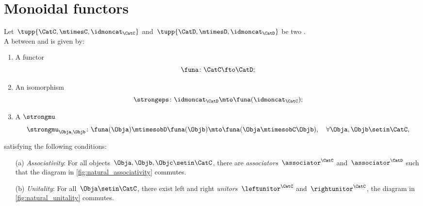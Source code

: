 
\section{Monoidal functors}
\label{sec:monoidal-functors}
\begin{ctdefinition}
    \label{def:strong-monoidal-functor}
    Let~$\tupp{\CatC,{{\mtimesC}},\idmoncat_{\CatC}}$ and~$\tupp{\CatD,{{\mtimesD}},\idmoncat_{\CatD}}$ be two .
    \\
    A  between \CatC and \CatD is given by:
    \begin{enumerate}
        \item A functor
              \begin{equation}
                  \funa \colon \CatC \fto \CatD;
              \end{equation}
        \item An isomorphism
              \begin{equation}
                  \strongeps\colon \idmoncat_{\CatD}\mto \funa(\idmoncat_{\CatC});
              \end{equation}
        \item A  $\strongmu$
              \begin{equation}
                  \strongmu_{\Obja,\Objb}\colon \funa(\Obja)\mtimesobD \funa(\Objb) \mto \funa(\Obja \mtimesobC \Objb),\quad \forall \Obja,\Objb\setin \CatC,
              \end{equation}
    \end{enumerate}
    satisfying the following conditions:
    \begin{enumerate}
        \item[(a)] \emph{Associativity}: For all objects~$\Obja,\Objb,\Objc\setin \CatC$, there are  \emph{associators}~$\associator^\CatC$ and~$\associator^\CatD$ such that the diagram in \cref{fig:natural_associativity} commutes.
        \item[(b)] \emph{Unitality}: For all~$\Obja\setin \CatC$, there exist left and right \emph{unitors}~$\leftunitor^\CatC$ and~$\rightunitor^\CatC$, the diagram in
            \cref{fig:natural_unitality} commutes.
    \end{enumerate}
\end{ctdefinition}
